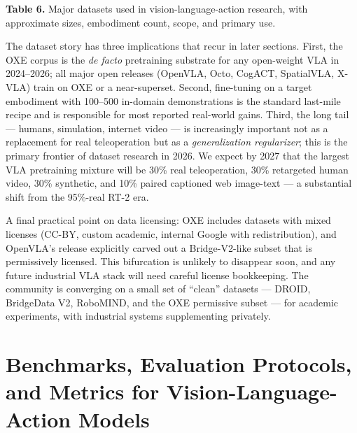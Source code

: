\documentclass{article}
\begin{document}
\textbf{Table 6.} Major datasets used in vision-language-action research, with approximate sizes, embodiment count, scope, and primary use.

The dataset story has three implications that recur in later sections. First, the OXE corpus is the \emph{de facto} pretraining substrate for any open-weight VLA in 2024--2026; all major open releases (OpenVLA, Octo, CogACT, SpatialVLA, X-VLA) train on OXE or a near-superset. Second, fine-tuning on a target embodiment with 100--500 in-domain demonstrations is the standard last-mile recipe and is responsible for most reported real-world gains. Third, the long tail --- humans, simulation, internet video --- is increasingly important not as a replacement for real teleoperation but as a \emph{generalization regularizer}; this is the primary frontier of dataset research in 2026. We expect by 2027 that the largest VLA pretraining mixture will be 30\% real teleoperation, 30\% retargeted human video, 30\% synthetic, and 10\% paired captioned web image-text --- a substantial shift from the 95\%-real RT-2 era.

A final practical point on data licensing: OXE includes datasets with mixed licenses (CC-BY, custom academic, internal Google with redistribution), and OpenVLA's release explicitly carved out a Bridge-V2-like subset that is permissively licensed. This bifurcation is unlikely to disappear soon, and any future industrial VLA stack will need careful license bookkeeping. The community is converging on a small set of ``clean'' datasets --- DROID, BridgeData V2, RoboMIND, and the OXE permissive subset --- for academic experiments, with industrial systems supplementing privately.

\section{Benchmarks, Evaluation Protocols, and Metrics for Vision-Language-Action Models}\label{benchmarks-evaluation-protocols-and-metrics-for-vision-language-action-models}
\end{document}
